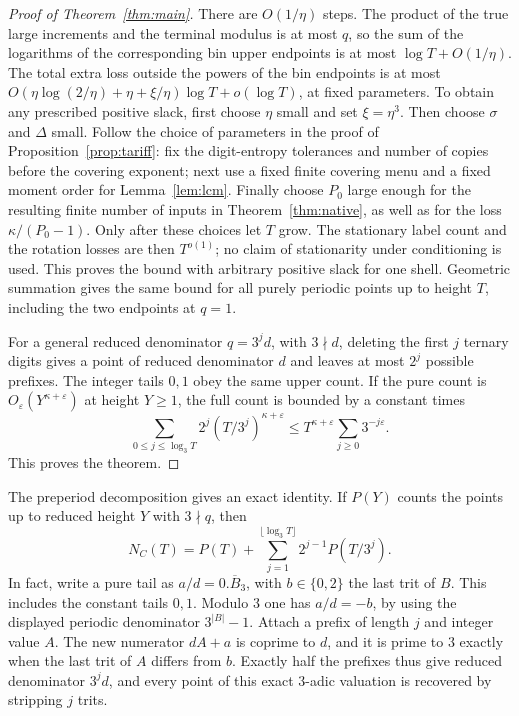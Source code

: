 \begin{proof}[Proof of Theorem~\ref{thm:main}]
There are \(O(1/\eta)\) steps. The product of the true large increments
and the terminal modulus is at most \(q\), so the sum of the logarithms
of the corresponding bin upper endpoints is at most
\(\log T+O(1/\eta)\). The total extra loss outside the powers of the bin
endpoints is at most
\(O(\eta\log(2/\eta)+\eta+\xi/\eta)\log T+o(\log T)\), at fixed
parameters. To obtain any prescribed positive slack, first choose
\(\eta\) small and set \(\xi=\eta^3\). Then choose \(\sigma\) and
\(\Delta\) small. Follow the choice of parameters in the proof of
Proposition~\ref{prop:tariff}: fix the digit-entropy tolerances and
number of copies before the covering exponent; next use a fixed
finite covering menu and a fixed moment order for
Lemma~\ref{lem:lcm}. Finally choose \(P_0\) large enough for the
resulting finite number of inputs in Theorem~\ref{thm:native}, as well
as for the loss \(\kappa/(P_0-1)\). Only after these choices let \(T\)
grow. The stationary label count and the rotation losses are then
\(T^{o(1)}\); no claim of stationarity under conditioning is used.
This proves the bound with arbitrary positive slack for one shell.
Geometric summation gives the same bound for all purely periodic
points up to height \(T\), including the two endpoints at \(q=1\).

For a general reduced denominator \(q=3^j d\), with \(3\nmid d\),
deleting the first \(j\) ternary digits gives a point of reduced
denominator \(d\) and leaves at most \(2^j\) possible prefixes.
The integer tails \(0,1\) obey the same upper count. If the pure count
is \(O_\varepsilon(Y^{\kappa+\varepsilon})\) at height \(Y\ge1\),
the full count is bounded by a constant times
\[
 \sum_{0\le j\le\log_3 T} 2^j
                  (T/3^j)^{\kappa+\varepsilon}
 \le T^{\kappa+\varepsilon}\sum_{j\ge0}3^{-j\varepsilon}.
\]
This proves the theorem.
\end{proof}

The preperiod decomposition gives an exact identity. If \(P(Y)\)
counts the points up to reduced height \(Y\) with \(3\nmid q\), then
\begin{equation}\label{eq:preperiod}
 N_C(T)=P(T)+\sum_{j=1}^{\lfloor\log_3 T\rfloor}2^{j-1}P(T/3^j).
\end{equation}
In fact, write a pure tail as \(a/d=0.\overline B_3\), with
\(b\in\{0,2\}\) the last trit of \(B\). This includes the constant
tails \(0,1\). Modulo \(3\) one has \(a/d=-b\), by using the displayed
periodic denominator \(3^{|B|}-1\). Attach a prefix of length \(j\)
and integer value \(A\). The new numerator \(dA+a\) is coprime
to \(d\), and it is prime to \(3\) exactly when the last trit of
\(A\) differs from \(b\). Exactly half the prefixes thus give reduced
denominator \(3^j d\), and every point of this exact \(3\)-adic
valuation is recovered by stripping \(j\) trits.

